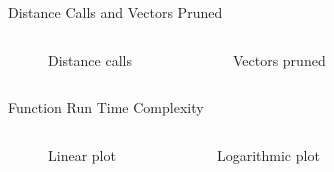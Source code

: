 \begin{frame}{Distance Calls and Vectors Pruned}
        {}
    \begin{columns}[c]
        \begin{figure}[H]
            \caption{Distance calls}
        \end{figure}

        \begin{figure}[H]
            \caption{Vectors pruned}
        \end{figure}
    \end{columns}
\end{frame}

\begin{frame}[label=runTimeComplexity]{Function Run Time Complexity}
        {}
    \begin{columns}[c]
        \begin{figure}[H]
            \caption{Linear plot}
        \end{figure}

        \begin{figure}[H]
            \caption{Logarithmic plot}
        \end{figure}
    \end{columns}
\end{frame}
